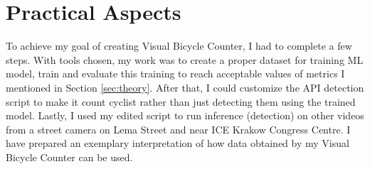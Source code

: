 \chapter{Practical Aspects}
\label{cha:practicalAspects}

To achieve my goal of creating Visual Bicycle Counter, I had to complete a few steps. With tools chosen, my work was to create a proper dataset for training ML model, train and evaluate this training to reach acceptable values of metrics I mentioned in Section \ref{sec:theory}. After that, I could customize the API detection script to make it count cyclist rather than just detecting them using the trained model. Lastly, I used my edited script to run inference (detection) on other videos from a street camera on Lema Street and near ICE Krakow Congress Centre. I have prepared an exemplary interpretation of how data obtained by my Visual Bicycle Counter can be used.
